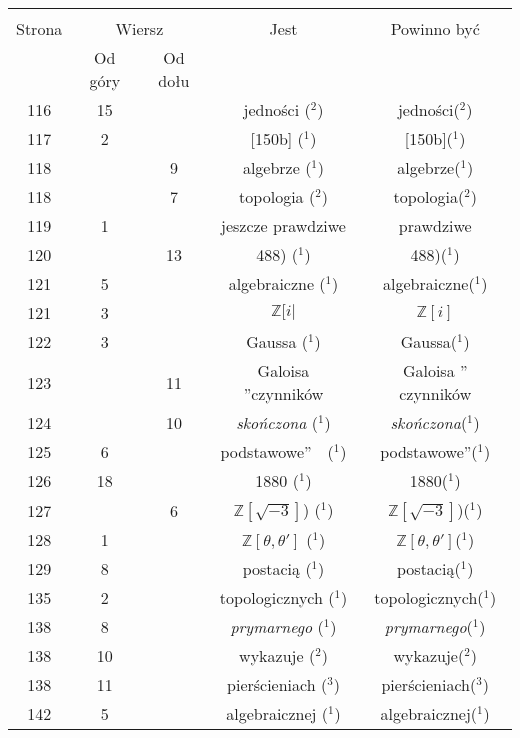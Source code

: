 \documentclass[a4paper,11pt]{article}
\begin{document}
\begin{center}
  \begin{tabular}{|c|c|c|c|c|}
    \hline
    & \multicolumn{2}{c|}{} & & \\
    Strona & \multicolumn{2}{c|}{Wiersz} & Jest
                              & Powinno być \\ \cline{2-3}
    & Od góry & Od dołu & & \\
    \hline
    116 & 15 & & jedności ($^{ 2 }$) & jedności($^{ 2 }$) \\
    117 &  2 & & [150b] ($^{ 1 }$) & [150b]($^{ 1 }$) \\
    118 & &  9 & algebrze ($^{ 1 }$) & algebrze($^{ 1 }$) \\
    118 & &  7 & topologia ($^{ 2 }$) & topologia($^{ 2 }$) \\
    119 &  1 & & jeszcze prawdziwe & prawdziwe \\
    120 & & 13 & 488) ($^{ 1 }$) & 488)($^{ 1 }$) \\
    121 &  5 & & algebraiczne ($^{ 1 }$) & algebraiczne($^{ 1 }$) \\
    121 &  3 & & $\mathbb{Z}[ i |$ & $\mathbb{Z}[ i ]$ \\
    122 &  3 & & Gaussa ($^{ 1 }$) & Gaussa($^{ 1 }$) \\
    123 & & 11 & Galoisa ”czynników  & Galoisa ” czynników \\
    124 & & 10 & \emph{skończona} ($^{ 1 }$) & \emph{skończona}($^{ 1 }$) \\
    125 &  6 & & podstawowe”~~($^{ 1 }$) & podstawowe”($^{ 1 }$) \\
    126 & 18 & & 1880 ($^{ 1 }$) & 1880($^{ 1 }$) \\
    127 & &  6 & $\mathbb{Z}[ \sqrt{ -3 } ]$) ($^{ 1 }$)
           & $\mathbb{Z}[ \sqrt{ -3 } ]$)($^{ 1 }$) \\
    128 &  1 & & $\mathbb{Z}[ \theta, \theta' ]$ ($^{ 1 }$)
           & $\mathbb{Z}[ \theta, \theta' ]$($^{ 1 }$) \\
    129 &  8 & & postacią ($^{ 1 }$) & postacią($^{ 1 }$) \\
    135 &  2 & & topologicznych ($^{ 1 }$) & topologicznych($^{ 1 }$) \\
    138 &  8 & & \emph{prymarnego} ($^{ 1 }$)
           & \emph{prymarnego}($^{ 1 }$) \\
    138 & 10 & & wykazuje ($^{ 2 }$) & wykazuje($^{ 2 }$) \\
    138 & 11 & & pierścieniach ($^{ 3 }$) & pierścieniach($^{ 3 }$) \\
    142 &  5 & & algebraicznej ($^{ 1 }$) & algebraicznej($^{ 1 }$) \\

\end{tabular}
\end{center}
\end{document}
